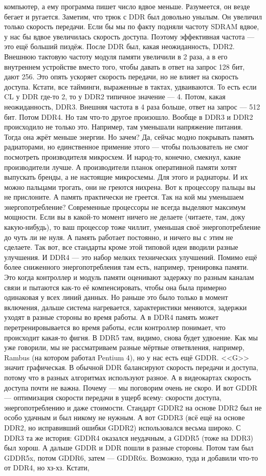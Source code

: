\documentclass{article}
\begin{document}
компьютер, а ему программа пишет число вдвое меньше. Разумеется, он везде бегает и ругается. Заметим, что трюк с DDR был довольно унылым. Он увеличил только скорость передачи. Если бы мы по факту подняли частоту SDRAM вдвое, у нас бы вдвое увеличилась скорость доступа. Поэтому эффективная частота --- это ещё больший пиздёж. После DDR был, какая неожиданность, DDR2. Внешнюю тактовую частоту модуля памяти увеличили в 2 раза, а в его внутреннем устройстве вместо того, чтобы давать в ответ на запрос 128 бит, дают 256. Это опять ускоряет скорость передачи, но не влияет на скорость доступа. Кстати, все тайминги, выраженные в тактах, удваиваются. То есть если CL у DDR где-то 2, то у DDR2 типичное значение --- 4. Потом, какая неожиданность, DDR3. Внешняя частота в 4 раза больше, ответ на запрос --- 512 бит. Потом DDR4. Но там что-то другое произошло. Вообще в DDR3 и DDR2 происходило не только это. Например, там уменьшали напряжение питания. Тогда она жрёт меньше энергии. Но зачем? Да, сейчас модно покрывать память радиаторами, но единственное примение этого --- чтобы пользователь не смог посмотреть производителя микросхем. И народ-то, конечно, смекнул, какие производители лучше. А производители планок оперативной памяти хотят выпускать бренды, а не настоящие микросхемы. Для этого и радиаторы. И их можно пальцами трогать, они не греются нихрена. Вот к процессору пальцы вы не прислоните. А память практически не греется. Так на кой мы уменьшаем энергопотребление? Современные процессоры не всегда выделяют максимум мощности. Если вы в какой-то момент ничего не делаете (читаете, там, доку какую-нибудь), то ваш процессор тоже чиллит, уменьшая своё энергопотребление до чуть ли не нуля. А память работает постоянно, и ничего вы с этим не сделаете. Так вот, все стандарты кроме этой типовой идеи вводили разные улучшения. И DDR4 --- это набор мелких технических улучшений. Помимо ещё более сниженного энергопотребления там есть, например, тренировка памяти. Это когда контроллер и модуль памяти оценивают задержку по разным каналам связи и пытаются как-то её компенсировать, чтобы она была примерно одинаковая у всех линий данных. Но раньше это было только в момент включения, дальше система нагревается, характеристики меняются, задержки уходят в разные стороны во время работы. А в DDR4 память может перетренировывается во время работы, если контроллер понимает, что происходит какая-то фигня. В DDR5 там, видимо, снова будет удвоение. Как мы уже говорили, мы не рассматриваем разные мёртвые ответвления, например, Rambus (на котором работал Pentium 4), но у нас есть ещё GDDR. <<G>> значит графическая. В обычной DDR балансируют скорость передачи и доступа, потому что в разных алгоритмах используют разное. А в видеокартах скорость доступа почти не важна. Почему --- мы поговорим очень не скоро. И вот GDDR --- оптимизация скорости передачи в ущерб всему: скорости доступа, энергопотреблению и даже стоимости. Стандарт GDDR2 на основе DDR2 был не особо удачным и был никому не нужным. А вот GDDR3 (всё ещё на основе DDR2, но исправивший ошибки GDDR2) использовался весьма широко. С DDR3 та же история: GDDR4 оказался неудачным, а GDDR5 (тоже на DDR3) был хорош. А дальше GDDR и DDR пошли в разные стороны. Потом там был GDDR5x, потом GDDR6, затем --- GDDR6x. Возможно, туда и добавили что-то от DDR4, но хз-хз. Кстати, 
\end{document}
